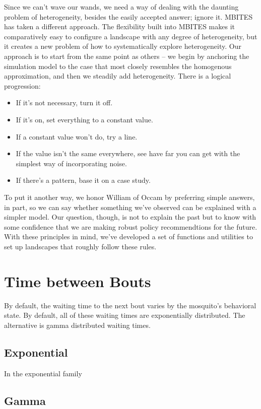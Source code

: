 \documentclass{article}
\begin{document}
Since we can't wave our wands, we need a way of dealing with the daunting problem of heterogeneity, besides the easily accepted answer; ignore it. MBITES has taken a different approach. The flexibility built into MBITES makes it comparatively easy to configure a landscape with any degree of heterogeneity, but it creates a new problem of how to systematically explore heterogeneity.  Our approach is to start from the same point as others -- we begin by anchoring the simulation model to the case that most closely resembles the homogenous approximation, and then we steadily add heterogeneity. There is a logical progression: 
\begin{itemize}
\item If it's not necessary, turn it off. 
\item If it's on, set everything to a constant value. 
\item If a constant value won't do, try a line. 
\item If the value isn't the same everywhere, see have far you can get with the simplest way of incorporating noise.
\item If there's a pattern, base it on a case study.  
\end{itemize}
To put it another way, we honor William of Occam by preferring simple answers, in part, so we can say whether something we've observed can be explained with a simpler model. Our question, though, is not to explain the past but to know with some confidence that we are making robust policy recommendtions for the future. With these principles in mind, we've developed a set of functions and utilities to set up landscapes that roughly follow these rules. 

\section{Time between Bouts}

By default, the waiting time to the next bout varies by the mosquito's behavioral state. By default, all of these waiting times are exponentially distributed. The alternative is gamma distributed waiting times. 

\subsection{Exponential}

In the exponential family

\subsection{Gamma}
\end{document}
